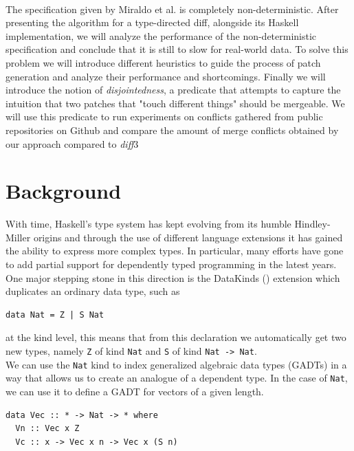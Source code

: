 \documentclass[11pt, titlepage]{article}
\newcommand{\diff}{\emph{diff}}
\begin{document}
\\
The specification given by Miraldo et al. \cite{type-directed-diff} is completely non-deterministic. After presenting the algorithm for a type-directed diff, alongside its Haskell implementation, we will analyze the performance of the non-deterministic specification and conclude that it is still to slow for real-world data. 
To solve this problem we will introduce different heuristics to guide the process of patch generation and analyze their performance and shortcomings.
Finally we will introduce the notion of \emph{disjointedness}, a predicate that attempts to capture the intuition that two patches that "touch different things" should be mergeable. We will use this predicate to run experiments on conflicts gathered from public repositories on Github and compare the amount of merge conflicts obtained by our approach compared to \diff3

\section{Background}\label{dependent-types-in-haskell}

With time, Haskell's type system has kept evolving from its humble Hindley-Miller origins and through the use of different language extensions it has gained the ability to express more complex types. In particular, many efforts have gone to add partial support for dependently typed programming in the latest years.
\\
One major stepping stone in this direction is the DataKinds (\cite{datakinds}) extension which duplicates an ordinary data type, such as

\begin{verbatim}
data Nat = Z | S Nat
\end{verbatim}

at the kind level, this means that from this declaration we automatically get two new types, namely \texttt{Z} of kind \texttt{Nat}
and \texttt{S} of kind \texttt{Nat\ -\textgreater{}\ Nat}.
\\
We can use the \texttt{Nat} kind to index generalized algebraic data
types (GADTs) in a way that allows us to create an analogue of a
dependent type. In the case of \texttt{Nat}, we can use it to define a
GADT for vectors of a given length.
\\
\begin{verbatim}
data Vec :: * -> Nat -> * where
  Vn :: Vec x Z
  Vc :: x -> Vec x n -> Vec x (S n)
\end{verbatim}
\end{document}
